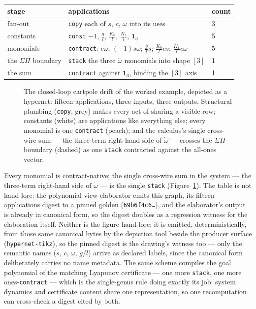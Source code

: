 \begin{center}
\begin{tabular}{@{}lll@{}}
\toprule
stage & applications & count \\
\midrule
fan-out & \texttt{copy} each of $s$, $c$, $\omega$ into its uses & 3 \\
constants & \texttt{const} $-1$, $\tfrac{g}{l}$, $\tfrac{K_0}{l}$, $\tfrac{K_1}{l}$, $\mathbf{1}_3$ & 5 \\
monomials & \texttt{contract}: $c\omega$; $(-1)s\omega$; $\tfrac{g}{l}s$; $\tfrac{K_0}{l}cs$; $\tfrac{K_1}{l}c\omega$ & 5 \\
the $\Sigma\Pi$ boundary & \texttt{stack} the three $\dot\omega$ monomials into shape $[3]$ & 1 \\
the sum & \texttt{contract} against $\mathbf{1}_3$, binding the $[3]$ axis & 1 \\
\bottomrule
\end{tabular}
\end{center}

\begin{figure}[t]
\centering

\caption{The closed-loop cartpole drift of the worked example,
depicted as a hypernet: fifteen applications, three inputs, three
outputs.
Structural plumbing (\texttt{copy}, grey) makes every act of sharing
a visible row; constants (white) are applications like everything
else; every monomial is one \texttt{contract} (peach); and the
calculus's single cross-wire sum --- the three-term right-hand side
of $\dot\omega$ --- crosses the $\Sigma\Pi$ boundary (dashed) as one
\texttt{stack} contracted against the all-ones vector.}
\label{fig:hyp-cartpole}
\end{figure}

Every monomial is contract-native; the single cross-wire sum in the
system --- the three-term right-hand side of $\dot\omega$ --- is the
single \texttt{stack} (Figure~\ref{fig:hyp-cartpole}). The table is
not hand-lore: the polynomial
view elaborator emits this graph, its fifteen applications digest to
a pinned golden
(\texttt{69b6f4c6\ldots}), and the elaborator's output is already in
canonical form, so the digest doubles as a regression witness for the
elaboration itself. Neither is the figure hand-lore: it is emitted,
deterministically, from those same canonical bytes by the depiction
tool beside the producer surface (\texttt{hypernet-tikz}), so the
pinned digest is the drawing's witness too --- only the semantic
names ($s$, $c$, $\omega$, $g/l$) arrive as declared labels, since
the canonical form deliberately carries no name metadata. The same scheme compiles the goal polynomial of
the matching Lyapunov certificate --- one more \texttt{stack}, one
more ones-\texttt{contract} --- which is the single-genus rule doing
exactly its job: system dynamics and certificate content share one
representation, so one recomputation can cross-check a digest cited
by both.

